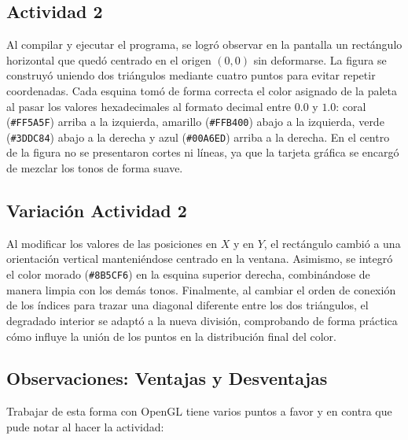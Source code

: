 \subsection{Actividad 2}

Al compilar y ejecutar el programa, se logró observar en la pantalla un rectángulo horizontal que quedó centrado en el origen $(0,0)$ sin deformarse. La figura se construyó uniendo dos triángulos mediante cuatro puntos para evitar repetir coordenadas. Cada esquina tomó de forma correcta el color asignado de la paleta al pasar los valores hexadecimales al formato decimal entre $0.0$ y $1.0$: coral (\texttt{\#FF5A5F}) arriba a la izquierda, amarillo (\texttt{\#FFB400}) abajo a la izquierda, verde (\texttt{\#3DDC84}) abajo a la derecha y azul (\texttt{\#00A6ED}) arriba a la derecha. En el centro de la figura no se presentaron cortes ni líneas, ya que la tarjeta gráfica se encargó de mezclar los tonos de forma suave.

\subsection*{Variación Actividad 2}

Al modificar los valores de las posiciones en $X$ y en $Y$, el rectángulo cambió a una orientación vertical manteniéndose centrado en la ventana. Asimismo, se integró el color morado (\texttt{\#8B5CF6}) en la esquina superior derecha, combinándose de manera limpia con los demás tonos. Finalmente, al cambiar el orden de conexión de los índices para trazar una diagonal diferente entre los dos triángulos, el degradado interior se adaptó a la nueva división, comprobando de forma práctica cómo influye la unión de los puntos en la distribución final del color.

\subsection*{Observaciones: Ventajas y Desventajas}

Trabajar de esta forma con OpenGL tiene varios puntos a favor y en contra que pude notar al hacer la actividad:

